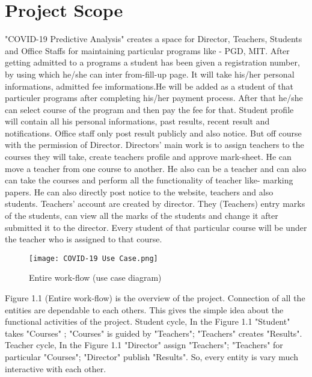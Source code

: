 \documentclass{scrreprt}
\begin{document}
\section{Project Scope}
"COVID-19 Predictive Analysis" creates a space for Director, Teachers, Students and Office Staffs for maintaining particular programs like - PGD, MIT. 
\newline
After getting admitted to a programs a student has been given a registration number, by using which he/she can inter from-fill-up page. It will take his/her personal informations, admitted fee imformations.He will be added as a student of that particuler programs after completing his/her payment process. After that he/she can select course of the program and then pay the fee for that. Student profile will contain all his personal informations, past results, recent result and notifications.
\newline
Office staff only post result publicly and also notice. But off course with the permission of Director.  
\newline
Directors' main work is to assign teachers to the courses they will take, create teachers profile and approve mark-sheet. He can move a teacher from one course to another. He also can be a teacher and can also can take the courses and perform all the functionality of teacher like- marking papers. He can also directly post notice to the website, teachers and also students.
\newline
Teachers' account are created by director. They (Teachers) entry marks of the students, can view all the marks of the students and change it after submitted it to the director. Every student of that particular course will be under the teacher who is assigned to that course. 
\newline
\begin{figure}
    \centering
    \texttt{[image: COVID-19 Use Case.png]}
    \caption{Entire work-flow (use case diagram)}
    \label{fig:COVID-19 Predictive Analysis}
\end{figure}
\newline
Figure 1.1 (Entire work-flow) is the overview of the project. Connection of all the entities are dependable to each others.  This gives the simple idea about the functional activities of the project. 
\newline
Student cycle, In the Figure 1.1 "Student" takes "Courses" ; "Courses" is guided by "Teachers"; "Teachers" creates "Results". 
\newline
Teacher cycle, In the Figure 1.1 "Director" assign "Teachers"; "Teachers" for particular "Courses"; "Director" publish "Results".
\newline
So, every entity is vary much interactive with each other.
\end{document}
